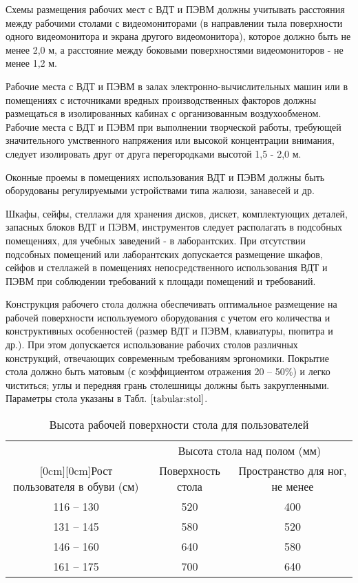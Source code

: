 \documentclass[12pt,a4paper]{report}
\begin{document}
Схемы размещения рабочих мест с ВДТ и ПЭВМ должны учитывать расстояния между рабочими столами с видеомониторами (в направлении тыла поверхности одного видеомонитора и экрана другого видеомонитора), которое должно быть не менее 2,0 м, а расстояние между боковыми поверхностями видеомониторов - не менее 1,2 м. 

Рабочие места с ВДТ и ПЭВМ в залах электронно-вычислительных машин или в помещениях с источниками вредных производственных факторов должны размещаться в изолированных кабинах с организованным воздухообменом. Рабочие места с ВДТ и ПЭВМ при выполнении творческой работы, требующей значительного умственного напряжения или высокой концентрации внимания, следует изолировать друг от друга перегородками высотой 1,5 - 2,0 м. 

Оконные проемы в помещениях использования ВДТ и ПЭВМ должны быть оборудованы регулируемыми устройствами типа жалюзи, занавесей и др.

Шкафы, сейфы, стеллажи для хранения дисков, дискет, комплектующих деталей, запасных блоков ВДТ и ПЭВМ, инструментов следует располагать в подсобных помещениях, для учебных заведений - в лаборантских. При отсутствии подсобных помещений или лаборантских допускается размещение шкафов, сейфов и стеллажей в помещениях непосредственного использования ВДТ и ПЭВМ при соблюдении требований к площади помещений и требований.

Конструкция рабочего стола должна обеспечивать оптимальное размещение на рабочей поверхности используемого оборудования с учетом его количества и конструктивных особенностей (размер ВДТ и ПЭВМ, клавиатуры, пюпитра и др.). При этом допускается использование рабочих столов различных конструкций, отвечающих современным требованиям эргономики. Покрытие стола должно быть матовым (с коэффициентом отражения 20 – 50\%) и легко чиститься; углы и передняя грань столешницы должны быть закругленными. Параметры стола указаны в Табл. $\ref{tabular:stol}$.

\begin{table} [H]
\label{tabular:stol}
\begin{center}
\begin{tabular}{|c|c|c|}
\hline
& \multicolumn{2}{c|}{Высота стола над полом (мм)} \\
\cline{2-3}
\raisebox{1.5ex}[0cm][0cm]{Рост пользователя в обуви (см)}
& Поверхность стола & Пространство для ног, не менее \\
\hline
116 -- 130 & 520 & 400 \\
\hline
131 -- 145 & 580 & 520 \\
\hline
146 -- 160 & 640 & 580 \\
\hline
161 -- 175 & 700 & 640 \\
\hline
\end{tabular}
\end{center}
\caption{Высота рабочей поверхности стола для пользователей}
\end{table}
\end{document}
